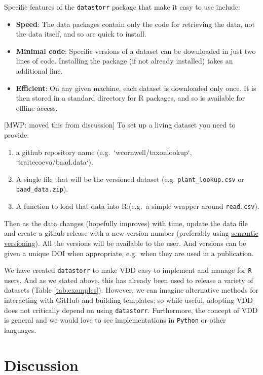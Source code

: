 \documentclass[a4paper,11pt]{article}
\begin{document}
Specific features of the \texttt{datastorr} package that make it easy to use include:

\begin{itemize}
  \item \textbf{Speed}: The data packages contain only the code for retrieving the data, not the data itself, and so are quick to install.
  \item \textbf{Minimal code}: Specific versions of a dataset can be downloaded in just two lines of code. Installing the package (if not already installed) takes an additional line.
  \item \textbf{Efficient}: On any given machine, each dataset is downloaded only once. It is then stored in a standard directory for R packages, and so is available for offline access.
\end{itemize}

[MWP: moved this from discussion]
To set up a
living dataset you need to provide:
\begin{enumerate}
  \item a github repository name (e.g.~`wcornwell/taxonlookup`, `traitecoevo/baad.data`).
  \item A single file that will be the versioned dataset (e.g. \texttt{plant\_lookup.csv} or \texttt{baad\_data.zip}).
  \item A function to load that data into R:(e.g.~a simple wrapper around \texttt{read.csv}).
\end{enumerate}

Then as the data changes (hopefully improves) with time, update the data
file and create a github release with a new version number (preferably
using \href{http://semver.org/}{semantic versioning}). All the versions
will be available to the user. And versions can be given a unique DOI
when appropriate, e.g.~when they are used in a publication.


We have created \texttt{datastorr} to make VDD easy to implement and manage for \texttt{R} users. And as we stated above, this has already been used to release a variety of datasets (Table \ref{tab:examples}). However, we can imagine alternative methods for interacting with GitHub and building templates; so while useful, adopting VDD does not critically depend on using \texttt{datastorr}. Furthermore, the concept of VDD is general and we would love to see implementations in \texttt{Python} or other languages.

\section{Discussion}
\end{document}
